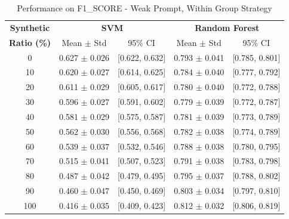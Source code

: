 \begin{table}[h]
\centering
\caption{Performance on F1_SCORE - Weak Prompt, Within Group Strategy}
\label{tab:weak_within_group_f1_score}
\begin{tabular}{c|cc|cc}
\hline
\textbf{Synthetic} & \multicolumn{2}{c|}{\textbf{SVM}} & \multicolumn{2}{c}{\textbf{Random Forest}} \\
\textbf{Ratio (\%)} & Mean $\pm$ Std & 95\% CI & Mean $\pm$ Std & 95\% CI \\
\hline
0 & 0.627 $\pm$ 0.026 & [0.622, 0.632] & 0.793 $\pm$ 0.041 & [0.785, 0.801] \\
10 & 0.620 $\pm$ 0.027 & [0.614, 0.625] & 0.784 $\pm$ 0.040 & [0.777, 0.792] \\
20 & 0.611 $\pm$ 0.029 & [0.605, 0.617] & 0.780 $\pm$ 0.040 & [0.772, 0.788] \\
30 & 0.596 $\pm$ 0.027 & [0.591, 0.602] & 0.779 $\pm$ 0.039 & [0.772, 0.787] \\
40 & 0.581 $\pm$ 0.029 & [0.575, 0.587] & 0.781 $\pm$ 0.039 & [0.773, 0.789] \\
50 & 0.562 $\pm$ 0.030 & [0.556, 0.568] & 0.782 $\pm$ 0.038 & [0.774, 0.789] \\
60 & 0.539 $\pm$ 0.037 & [0.532, 0.546] & 0.788 $\pm$ 0.038 & [0.780, 0.795] \\
70 & 0.515 $\pm$ 0.041 & [0.507, 0.523] & 0.791 $\pm$ 0.038 & [0.783, 0.798] \\
80 & 0.487 $\pm$ 0.042 & [0.479, 0.495] & 0.795 $\pm$ 0.037 & [0.788, 0.802] \\
90 & 0.460 $\pm$ 0.047 & [0.450, 0.469] & 0.803 $\pm$ 0.034 & [0.797, 0.810] \\
100 & 0.416 $\pm$ 0.035 & [0.409, 0.423] & 0.812 $\pm$ 0.032 & [0.806, 0.819] \\
\hline
\end{tabular}
\end{table}